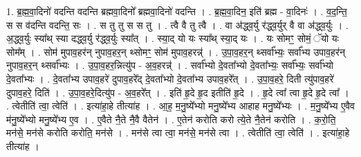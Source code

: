 \documentclass[17pt]{extarticle}
\begin{document}
1. ब्र॒ह्म॒वा॒दिनो॑ वदन्ति वदन्ति ब्रह्मवा॒दिनो᳚ ब्रह्मवा॒दिनो॑ वदन्ति । . ब्र॒ह्म॒वा॒दिन॒ इति॑ ब्रह्म - वा॒दिनः॑ । . व॒द॒न्ति॒ स स व॑दन्ति वदन्ति॒ सः । . स तु तु स स तु । . त्वै वै तु त्वै । . वा अ॑द्ध्व॒र्यु र॑द्ध्व॒र्युर् वै वा अ॑द्ध्व॒र्युः । . अ॒द्ध्व॒र्युः स्या᳚थ् स्या दद्ध्व॒र्यु र॑द्ध्व॒र्युः स्या᳚त् । . स्या॒द् यो यः स्या᳚थ् स्या॒द् यः । . यः सोमꣳ॒॒ सोमं॒ ॅयो यः सोम᳚म् । . सोम॑ मुपाव॒हर॑न् नुपाव॒हर॒न् थ्सोमꣳ॒॒ सोम॑ मुपाव॒हरन्न्॑ । . उ॒पा॒व॒हर॒न् थ्सर्वा᳚भ्यः॒ सर्वा᳚भ्य उपाव॒हर॑न् नुपाव॒हर॒न् थ्सर्वा᳚भ्यः । . उ॒पा॒व॒हर॒न्नित्यु॑प - अ॒व॒हरन्न्॑ । . सर्वा᳚भ्यो दे॒वता᳚भ्यो दे॒वता᳚भ्यः॒ सर्वा᳚भ्यः॒ सर्वा᳚भ्यो दे॒वता᳚भ्यः । . दे॒वता᳚भ्य उपाव॒हरे॑ दुपाव॒हरे᳚द् दे॒वता᳚भ्यो दे॒वता᳚भ्य उपाव॒हरे᳚त् । . उ॒पा॒व॒हरे॒ दिती त्यु॑पाव॒हरे॑ दुपाव॒हरे॒ दिति॑ । . उ॒पा॒व॒हरे॒दित्यु॑प - अ॒व॒हरे᳚त् । . इति॑ हृ॒दे हृ॒द इतीति॑ हृ॒दे । . हृ॒दे त्वा᳚ त्वा हृ॒दे हृ॒दे त्वा᳚ । . त्वेतीति॑ त्वा॒ त्वेति॑ । . इत्या॑हा॒हे तीत्या॑ह । . आ॒ह॒ म॒नु॒ष्ये᳚भ्यो मनु॒ष्ये᳚भ्य आहाह मनु॒ष्ये᳚भ्यः । . म॒नु॒ष्ये᳚भ्य ए॒वैव म॑नु॒ष्ये᳚भ्यो मनु॒ष्ये᳚भ्य ए॒व । . ए॒वैते नै॒ते नै॒वै वैतेन॑ । . ए॒तेन॑ करोति करो त्ये॒ते नै॒तेन॑ करोति । . क॒रो॒ति॒ मन॑से॒ मन॑से करोति करोति॒ मन॑से । . मन॑से त्वा त्वा॒ मन॑से॒ मन॑से त्वा । . त्वेतीति॑ त्वा॒ त्वेति॑ । . इत्या॑हा॒हे तीत्या॑ह । \newline
\end{document}
